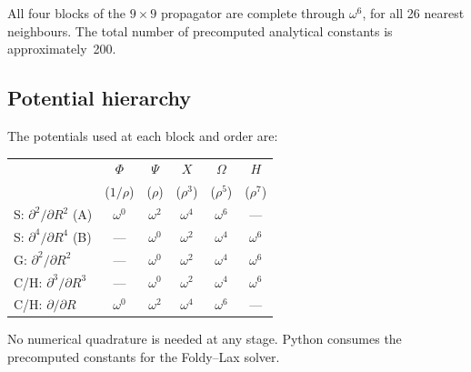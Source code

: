 \documentclass[11pt,a4paper]{article}
\theoremstyle{plain}
\theoremstyle{remark}
\begin{document}
All four blocks of the $9\times 9$ propagator are complete through
$\omega^6$, for all 26 nearest neighbours.  The total number of
precomputed analytical constants is approximately~200.

\subsection{Potential hierarchy}

The potentials used at each block and order are:

\begin{center}
\begin{tabular}{l*{5}{c}}
\toprule
& $\Phi$ & $\Psi$ & $X$ & $\Omega$ & $H$ \\
& ($1/\rho$) & ($\rho$) & ($\rho^3$) & ($\rho^5$) & ($\rho^7$) \\
\midrule
S: $\partial^2/\partial R^2$ (A) & $\omega^0$ & $\omega^2$ & $\omega^4$ & $\omega^6$ & --- \\
S: $\partial^4/\partial R^4$ (B) & --- & $\omega^0$ & $\omega^2$ & $\omega^4$ & $\omega^6$ \\
G: $\partial^2/\partial R^2$     & --- & $\omega^0$ & $\omega^2$ & $\omega^4$ & $\omega^6$ \\
C/H: $\partial^3/\partial R^3$   & --- & $\omega^0$ & $\omega^2$ & $\omega^4$ & $\omega^6$ \\
C/H: $\partial/\partial R$       & $\omega^0$ & $\omega^2$ & $\omega^4$ & $\omega^6$ & --- \\
\bottomrule
\end{tabular}
\end{center}

No numerical quadrature is needed at any stage.  Python consumes the
precomputed constants for the Foldy--Lax solver.
\end{document}
